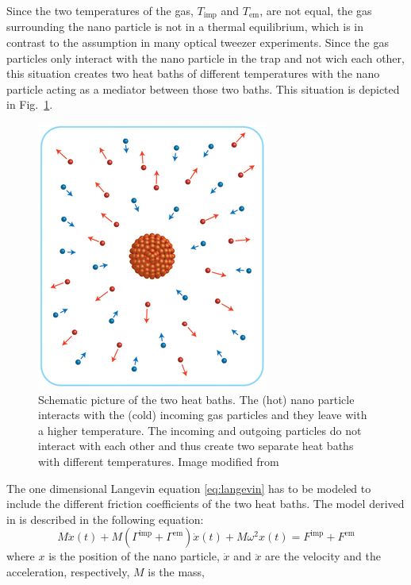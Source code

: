 \documentclass[12pt]{article}
\begin{document}
Since the two temperatures of the gas, $T_\text{imp}$ and $T_\text{em}$, are not equal, the gas surrounding the nano particle is not in a thermal
equilibrium, which is in contrast to the assumption in many optical tweezer experiments. Since the gas particles only interact with the nano particle
in the trap and not wich each other, this situation creates two heat baths of different temperatures with the nano particle acting as a mediator
between those two baths. This situation is depicted in
Fig.~\ref{fig:heatbaths}.
\begin{figure}[H]
    \begin{center}
        \includegraphics[scale=0.5]{images/nano_nonequilibrium_cropped.jpg}
        \caption{Schematic picture of the two heat baths. The (hot) nano particle interacts with the (cold) incoming gas particles and they leave with
        a higher temperature. The incoming and outgoing particles do not interact with each other and thus create two separate heat baths with
    different temperatures. Image modified from \cite{Kroy2014}}
        \label{fig:heatbaths}
    \end{center}
\end{figure}
The one dimensional Langevin equation \eqref{eq:langevin} has to be modeled to include the different friction coefficients of the two heat baths. The
model derived in \cite{MillenJ.2014} is described in the following equation:
\begin{equation}
    M\ddot{x}(t) + M\left(\Gamma^\text{imp}+\Gamma^\text{em}\right)\dot{x}(t) + M\omega^2x(t) =F^\text{imp}+F^\text{em}
\end{equation}
where $x$ is the position of the nano particle, $\dot{x}$ and $\ddot{x}$ are the velocity and the acceleration, respectively, $M$ is the mass,
\end{document}

